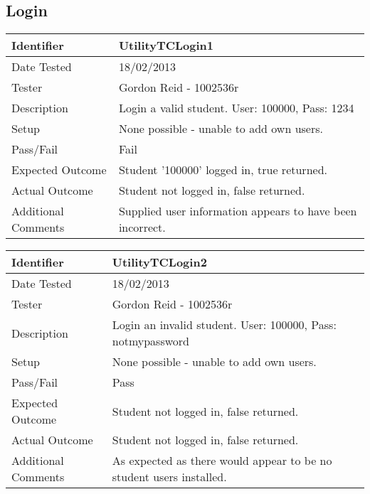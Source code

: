 \documentclass[11pt]{l3deliverable}
\begin{document}
\subsection{Login}

\begin{tabularx}{\textwidth}{|T|L|}
\hline
Identifier & UtilityTCLogin1\\
\hline
Date Tested & 18/02/2013\\
\hline
Tester & Gordon Reid - 1002536r\\
\hline
Description & Login a valid student. User: 100000, Pass: 1234\\
\hline
Setup & None possible - unable to add own users.\\
\hline
Pass/Fail & Fail\\
\hline
Expected Outcome & Student '100000' logged in, true returned.\\
\hline
Actual Outcome & Student not logged in, false returned.\\
\hline
Additional Comments & Supplied user information appears to have been incorrect.\\
\hline
\end{tabularx}

\vspace{2em}

\begin{tabularx}{\textwidth}{|T|L|}
\hline
Identifier & UtilityTCLogin2\\
\hline
Date Tested & 18/02/2013\\
\hline
Tester & Gordon Reid - 1002536r\\
\hline
Description & Login an invalid student. User: 100000, Pass: notmypassword\\
\hline
Setup & None possible - unable to add own users.\\
\hline
Pass/Fail & Pass\\
\hline
Expected Outcome & Student not logged in, false returned.\\
\hline
Actual Outcome & Student not logged in, false returned.\\
\hline
Additional Comments & As expected as there would appear to be no student users installed.\\
\hline
\end{tabularx}

\vspace{2em}
\end{document}
